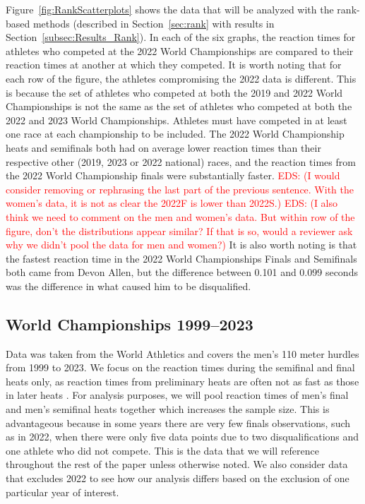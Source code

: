 \documentclass[12pt, letterpaper]{article}
\newcommand{\eds}[1]{\textcolor{red}{EDS: (#1)}}
\begin{document}
Figure~\ref{fig:RankScatterplots} shows the data that will be analyzed
with the rank-based methods (described in Section~\ref{sec:rank} with results in 
Section~\ref{subsec:Results_Rank}). In each of the six graphs, the reaction 
times for athletes who competed at the 2022 World Championships
are compared to their reaction times at another at which they competed. 
It is worth noting that for each row of the figure, the athletes compromising 
the 2022 data is different.  This is because the set of athletes who competed at 
both the 2019 and 2022 World Championships is not the same as the set of athletes 
who competed at both the 2022 and 2023 World Championships. %
Athletes must have competed in at least one race at each championship to be 
included.  The 2022 World
Championship heats and semifinals both had on average lower reaction times than
their respective other (2019, 2023 or 2022 national) races, and the reaction times 
from the 2022 World Championship finals were substantially faster. 
\eds{I would consider removing or rephrasing the last part of the previous 
sentence. With the women's data, it is not as clear the 2022F is lower than 2022S.}
\eds{I also think we need to comment on the men and women's data. But within row
of the figure, don't the distributions appear similar?  If that is so, would a 
reviewer ask why we didn't pool the data for men and women?}
It is also worth noting is that the fastest reaction time in the 2022 World
Championships Finals and Semifinals both came from Devon Allen, but the 
difference between 0.101 and 0.099
seconds was the difference in what caused him to be disqualified. 


\subsection{World Championships 1999--2023}\label{sec:dataworld}


Data was taken from the World Athletics 
and covers the men's 110 meter hurdles from 1999 to 2023.
We focus on the reaction times during the 
semifinal and final heats only, as reaction times from preliminary heats are 
often not as fast as those in later heats \citep[e.g.,][]{zhang2021correlation}. 
For analysis purposes, we will pool reaction times of men's final and 
men's semifinal heats together which increases the sample size. This is 
advantageous because in some years there are very few finals observations, such
as in 2022, when there were only five data points due to two disqualifications 
and one athlete who did not compete. This is the data that we will reference
throughout the rest of the paper unless otherwise noted. We also consider data 
that excludes 2022 to see how our analysis differs based on the exclusion of one
particular year of interest.
\end{document}
